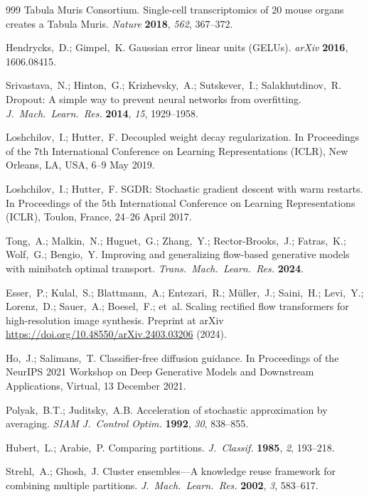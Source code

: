 \begin{thebibliography}{999}
Tabula Muris Consortium. Single-cell transcriptomics of 20 mouse organs creates a Tabula Muris. {\em Nature} {\bf 2018}, {\em 562}, 367--372.

Hendrycks,~D.; Gimpel,~K. Gaussian error linear units (GELUs). {\em arXiv} {\bf 2016}, 1606.08415.

Srivastava,~N.; Hinton,~G.; Krizhevsky,~A.; Sutskever,~I.; Salakhutdinov,~R. Dropout: A simple way to prevent neural networks from overfitting. {\em J.\ Mach.\ Learn.\ Res.} {\bf 2014}, {\em 15}, 1929--1958.

Loshchilov,~I.; Hutter,~F. Decoupled weight decay regularization. In Proceedings of the 7th International Conference on Learning Representations (ICLR), New Orleans, LA, USA, 6--9 May 2019.

Loshchilov,~I.; Hutter,~F. SGDR: Stochastic gradient descent with warm restarts. In Proceedings of the 5th International Conference on Learning Representations (ICLR), Toulon, France, 24--26 April 2017.

Tong,~A.; Malkin,~N.; Huguet,~G.; Zhang,~Y.; Rector-Brooks,~J.; Fatras,~K.; Wolf,~G.; Bengio,~Y. Improving and generalizing flow-based generative models with minibatch optimal transport. {\em Trans.\ Mach.\ Learn.\ Res.} {\bf 2024}.

Esser,~P.; Kulal,~S.; Blattmann,~A.; Entezari,~R.; M\"{u}ller,~J.; Saini,~H.; Levi,~Y.; Lorenz,~D.; Sauer,~A.; Boesel,~F.; et~al. Scaling rectified flow transformers for high-resolution image synthesis. Preprint at arXiv \url{https://doi.org/10.48550/arXiv.2403.03206} (2024).

Ho,~J.; Salimans,~T. Classifier-free diffusion guidance. In Proceedings of the NeurIPS 2021 Workshop on Deep Generative Models and Downstream Applications, Virtual, 13 December 2021.

Polyak,~B.T.; Juditsky,~A.B. Acceleration of stochastic approximation by averaging. {\em SIAM J.\ Control Optim.} {\bf 1992}, {\em 30}, 838--855.

Hubert,~L.; Arabie,~P. Comparing partitions. {\em J.\ Classif.} {\bf 1985}, {\em 2}, 193--218.

Strehl,~A.; Ghosh,~J. Cluster ensembles---A knowledge reuse framework for combining multiple partitions. {\em J.\ Mach.\ Learn.\ Res.} {\bf 2002}, {\em 3}, 583--617.


\end{thebibliography}

